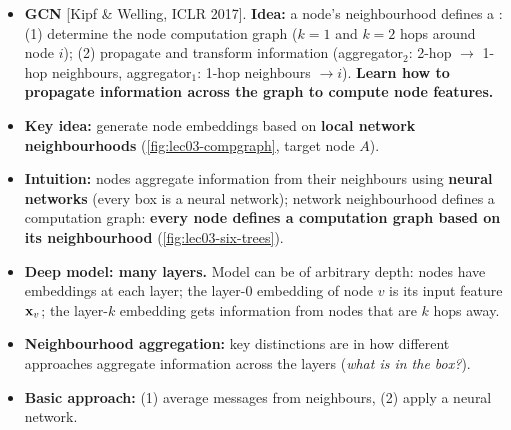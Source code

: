\begin{itemize}
  \item \textbf{GCN} [Kipf \& Welling, ICLR 2017]. \textbf{Idea:} a node's
    neighbourhood defines a : (1) determine the node
    computation graph ($k=1$ and $k=2$ hops around node $i$); (2) propagate and
    transform information (aggregator$_2$: 2-hop $\to$ 1-hop neighbours,
    aggregator$_1$: 1-hop neighbours $\to i$). \textbf{Learn how to propagate
    information across the graph to compute node features.}
  \item \textbf{Key idea:} generate node embeddings based on \textbf{local
    network neighbourhoods} (\cref{fig:lec03-compgraph}, target node $A$).
  \item \textbf{Intuition:} nodes aggregate information from their neighbours
    using \textbf{neural networks} (every box is a neural network); network
    neighbourhood defines a computation graph: \textbf{every node defines a
    computation graph based on its neighbourhood} (\cref{fig:lec03-six-trees}).
  \item \textbf{Deep model: many layers.} Model can be of arbitrary depth:
    nodes have embeddings at each layer; the layer-0 embedding of node $v$ is
    its input feature $\mathbf{x}_v$; the layer-$k$ embedding gets information from
    nodes that are $k$ hops away.
  \item \textbf{Neighbourhood aggregation:} key distinctions are in how
    different approaches aggregate information across the layers (\emph{what
    is in the box?}).
  \item \textbf{Basic approach:} (1) average messages from neighbours, (2)
    apply a neural network.
\end{itemize}

